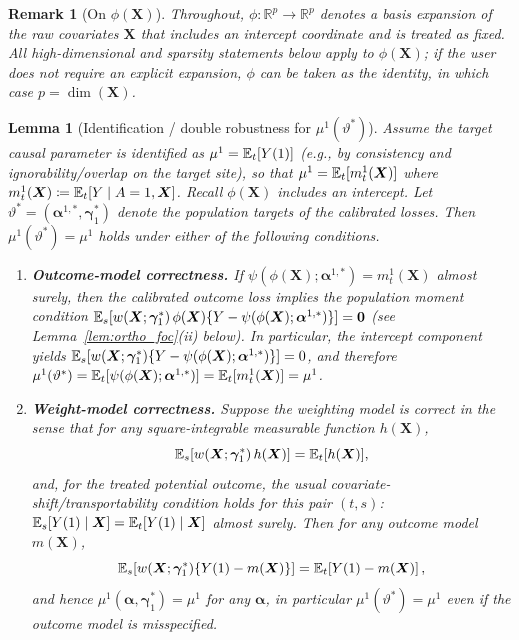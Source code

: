 \documentclass{article}
\newtheorem{lemma}[theorem]{Lemma}
\newtheorem{remark}{Remark}[section]
\begin{document}
\begin{remark}[On $\phi(\boldsymbol{X})$]\label{rem:phi_convention}
Throughout, $\phi:\mathbb{R}^p\to\mathbb{R}^p$ denotes a basis expansion of the raw covariates $\boldsymbol{X}$ that includes an intercept coordinate and is treated as fixed. All high-dimensional and sparsity statements below apply to $\phi(\boldsymbol{X})$; if the user does not require an explicit expansion, $\phi$ can be taken as the identity, in which case $p=\dim(\boldsymbol{X})$.
\end{remark}

\begin{lemma}[Identification / double robustness for $\mu^1(\vartheta^*)$]\label{lem:ident_dr_mu}
Assume the target causal parameter is identified as $\mu^1=\operatorname{\mathbb{E}}_t[Y(1)]$ (e.g., by consistency and ignorability/overlap on the target site), so that $\mu^1=\operatorname{\mathbb{E}}_t[m_t^1(\boldsymbol{X})]$ where $m_t^1(\boldsymbol{X})\coloneqq \operatorname{\mathbb{E}}_t[Y\mid A=1,\boldsymbol{X}]$.
Recall $\phi(\boldsymbol{X})$ includes an intercept.
Let $\vartheta^*=(\boldsymbol{\alpha}^{1,*},\boldsymbol{\gamma}_1^*)$ denote the population targets of the calibrated losses.
Then $\mu^1(\vartheta^*)=\mu^1$ holds under either of the following conditions.
\begin{enumerate}
    \item \textbf{Outcome-model correctness.} If $\psi(\phi(\boldsymbol{X});\boldsymbol{\alpha}^{1,*})=m_t^1(\boldsymbol{X})$ almost surely, then the calibrated outcome loss implies the population moment condition
    \(
    \operatorname{\mathbb{E}}_s[w(\boldsymbol{X};\boldsymbol{\gamma}_1^*)\,\phi(\boldsymbol{X})\{Y-\psi(\phi(\boldsymbol{X});\boldsymbol{\alpha}^{1,*})\}]=\mathbf{0}
    \)
    (see Lemma~\ref{lem:ortho_foc}(ii) below). In particular, the intercept component yields
    \(
    \operatorname{\mathbb{E}}_s[w(\boldsymbol{X};\boldsymbol{\gamma}_1^*)\{Y-\psi(\phi(\boldsymbol{X});\boldsymbol{\alpha}^{1,*})\}]=0
    \),
    and therefore $\mu^1(\vartheta^*)=\operatorname{\mathbb{E}}_t[\psi(\phi(\boldsymbol{X});\boldsymbol{\alpha}^{1,*})]=\operatorname{\mathbb{E}}_t[m_t^1(\boldsymbol{X})]=\mu^1$.
    \item \textbf{Weight-model correctness.} Suppose the weighting model is correct in the sense that for any square-integrable measurable function $h(\boldsymbol{X})$,
    \[
    \operatorname{\mathbb{E}}_s[w(\boldsymbol{X};\boldsymbol{\gamma}_1^*)\,h(\boldsymbol{X})]=\operatorname{\mathbb{E}}_t[h(\boldsymbol{X})],
    \]
    and, for the treated potential outcome, the usual covariate-shift/transportability condition holds for this pair $(t,s)$:
    \(
    \operatorname{\mathbb{E}}_s[Y(1)\mid \boldsymbol{X}] = \operatorname{\mathbb{E}}_t[Y(1)\mid \boldsymbol{X}]
    \)
    almost surely.
    Then for any outcome model $m(\boldsymbol{X})$,
    \[
    \operatorname{\mathbb{E}}_s\!\left[w(\boldsymbol{X};\boldsymbol{\gamma}_1^*)\{Y(1)-m(\boldsymbol{X})\}\right]
    =
    \operatorname{\mathbb{E}}_t\!\left[Y(1)-m(\boldsymbol{X})\right],
    \]
    and hence $\mu^1(\boldsymbol{\alpha},\boldsymbol{\gamma}_1^*)=\mu^1$ for any $\boldsymbol{\alpha}$, in particular $\mu^1(\vartheta^*)=\mu^1$ even if the outcome model is misspecified.
\end{enumerate}
\end{lemma}
\end{document}
